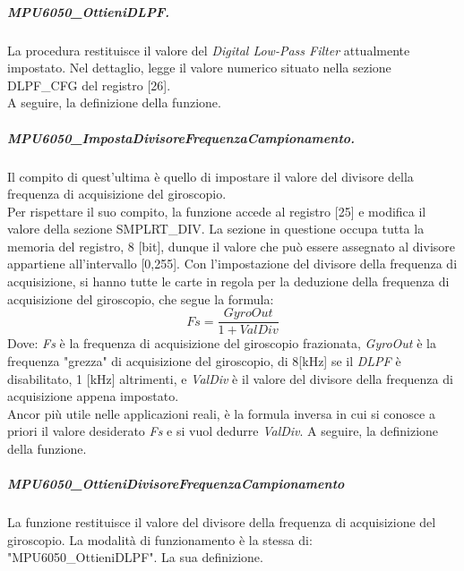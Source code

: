 \subparagraph{MPU6050\_OttieniDLPF.} 
La procedura restituisce il valore del \textit{Digital Low-Pass Filter} attualmente impostato. Nel dettaglio, legge il valore numerico situato nella sezione\\
DLPF\_CFG del registro [26].\\
A seguire, la definizione della funzione.


\subparagraph{MPU6050\_ImpostaDivisoreFrequenzaCampionamento.}
Il compito di quest'ultima è quello di impostare il valore del divisore della frequenza di acquisizione del giroscopio.\\
Per rispettare il suo compito, la funzione accede al registro [25] e modifica il valore della sezione SMPLRT\_DIV. La sezione in questione occupa tutta la memoria del registro, 8 [bit], dunque il valore che può essere assegnato al divisore appartiene all'intervallo [0,255].
Con l'impostazione del divisore della frequenza di acquisizione, si hanno tutte le carte in regola per la deduzione della frequenza di acquisizione del giroscopio, che segue la formula:
\begin{equation}
    Fs = \frac{GyroOut}{1 + ValDiv}
\end{equation}
Dove: \textit{Fs} è la frequenza di acquisizione del giroscopio frazionata, \textit{GyroOut} è la frequenza "grezza" di acquisizione del giroscopio, di 8[kHz] se il \textit{DLPF} è disabilitato, 1 [kHz] altrimenti, e \textit{ValDiv} è il valore del divisore della frequenza di acquisizione appena impostato.\\
Ancor più utile nelle applicazioni reali, è la formula inversa in cui si conosce a priori il valore desiderato \textit{Fs} e si vuol dedurre \textit{ValDiv}.
A seguire, la definizione della funzione.


\subparagraph{MPU6050\_OttieniDivisoreFrequenzaCampionamento}
La funzione restituisce il valore del divisore della frequenza di acquisizione del giroscopio. La modalità di funzionamento è la stessa di: "MPU6050\_OttieniDLPF".
La sua definizione.


